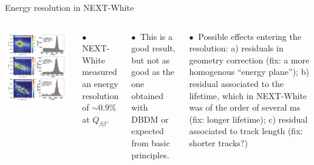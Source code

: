 \documentclass [aspectratio=169]{beamer}
\newcommand{\qbb}{\ensuremath{Q_{\beta\beta}}}
\begin{document}
\begin{frame}{Energy resolution in NEXT-White}

\begin{columns}
\includegraphics[scale=0.23]{eresWhite.png}

$\bullet~$ NEXT-White measured an energy resolution of $\sim 0.9$\% at \qbb.

$\bullet~$ This is a good result, but not as good as the one obtained with DBDM or expected from basic principles. 

$\bullet~$ Possible effects entering the resolution: a) residuals in geometry correction (fix: a more homogenous ``energy plane''); b) residual associated to the lifetime, which in NEXT-White was of the order of several ms (fix: longer lifetime); c) residual associated to track length (fix: shorter tracks?) 
  
\end{columns}
\end{frame}
\end{document}
